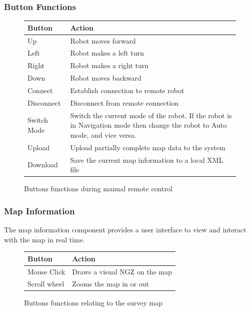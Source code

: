 \documentclass[10pt,a4paper,titlepage]{article}
\begin{document}
	\subsubsection*{Button Functions}
	\begin{figure}[H]
		\centering
		\begin{tabular}{|p{3cm}|p{6cm}|}
			\hline 
			\textbf{Button} &\textbf{Action} \\ \hline 
			Up & Robot moves forward \\ \hline 
			Left & Robot makes a left turn \\ \hline 
			Right & Robot makes a right turn \\ \hline 
			Down & Robot moves backward \\ \hline 
			Connect & Establish connection to remote robot \\ \hline 
			Disconnect & Disconnect from remote connection \\ \hline 
			Switch Mode & Switch the current mode of the robot. If the robot is in Navigation mode then change the robot to Auto mode, and vice versa. \\ \hline 
			Upload & Upload partially complete map data to the system \\ \hline
			Download & Save the current map information to a local XML file \\ \hline
		\end{tabular} 
		\caption{Buttons functions during manual remote control}
		\label{fig:button functions manual}
	\end{figure}
	
	\subsubsection*{Map Information}
	The map information component provides a user interface to view and interact with the map in real time.
	
	\begin{figure}[H]
		\centering
		\begin{tabular}{|p{3cm}|p{6cm}|}
			\hline 
			\textbf{Button} &\textbf{Action} \\ \hline 
			Mouse Click & Draws a visual NGZ on the map\\ \hline 
			Scroll wheel & Zooms the map in or out\\ \hline 
		\end{tabular} 
		\caption{Buttons functions relating to the survey map}
		\label{fig:button functions map}
	\end{figure}
	
\end{document}
